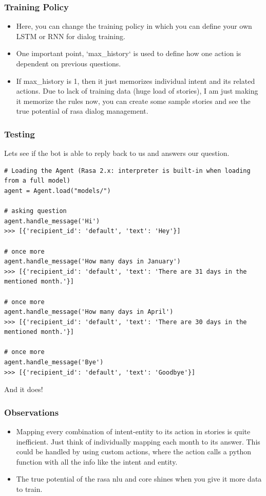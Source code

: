  \begin{frame}[fragile]\frametitle{Training Policy}

\begin{itemize}
\item Here, you can change the training policy in which you can define your own LSTM or RNN for dialog training. 
\item One important point, `max\_history` is used to define how one action is dependent on previous questions. 
\item If max\_history is 1, then it just memorizes individual intent and its related actions. Due to lack of training data (huge load of stories), I am just making it memorize the rules now, you can create some sample stories and see the true potential of rasa dialog management.
\end{itemize}
\end{frame}

 \begin{frame}[fragile]\frametitle{Testing}
Lets see if the bot is able to reply back to us and answers our question.

\begin{lstlisting}
# Loading the Agent (Rasa 2.x: interpreter is built-in when loading from a full model)
agent = Agent.load("models/")

# asking question
agent.handle_message('Hi')
>>> [{'recipient_id': 'default', 'text': 'Hey'}]

# once more
agent.handle_message('How many days in January')
>>> [{'recipient_id': 'default', 'text': 'There are 31 days in the mentioned month.'}]

# once more
agent.handle_message('How many days in April')
>>> [{'recipient_id': 'default', 'text': 'There are 30 days in the mentioned month.'}]

# once more
agent.handle_message('Bye')
>>> [{'recipient_id': 'default', 'text': 'Goodbye'}]
\end{lstlisting}

And it does!
\end{frame}

 \begin{frame}[fragile]\frametitle{Observations}

\begin{itemize}
\item Mapping every combination of intent-entity to its action in stories is quite inefficient. Just think of individually mapping each month to its answer. This could be handled by using custom actions, where the action calls a python function with all the info like the intent and entity.
\item The true potential of the rasa nlu and core shines when you give it more data to train.
\end{itemize}
\end{frame}


